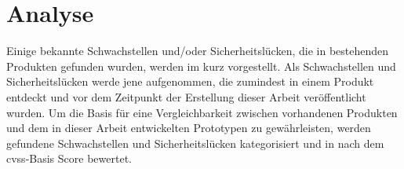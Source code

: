 \section{Analyse}
\label{sec:analysis}
	Einige bekannte Schwachstellen und/oder Sicherheitslücken, die in bestehenden Produkten gefunden wurden, werden im  kurz vorgestellt. 
	Als Schwachstellen und Sicherheitslücken werde jene aufgenommen, die zumindest in einem Produkt entdeckt und vor dem Zeitpunkt der Erstellung dieser Arbeit veröffentlicht wurden. 
	Um die Basis für eine Vergleichbarkeit zwischen vorhandenen Produkten und dem in dieser Arbeit entwickelten Prototypen zu gewährleisten, werden gefundene Schwachstellen und Sicherheitslücken kategorisiert und in  nach dem \gls{cvss}-Basis Score bewertet.
